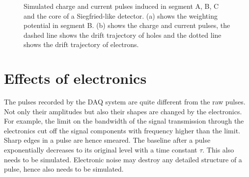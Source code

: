 \begin{figure}[htbp]
\centering
{}%
%
\caption{Simulated charge and current pulses induced in segment A, B, C and the core of a Siegfried-like detector. (a) shows the weighting potential in segment B. (b) shows the charge and current pulses, the dashed line shows the drift trajectory of holes and the dotted line shows the drift trajectory of electrons.}
\label{fig:pss:ps}
\end{figure}


\section{Effects of electronics}
\label{sec:pss:dbn}
The pulses recorded by the DAQ system are quite different from the raw pulses. Not only their amplitudes but also their shapes are changed by the electronics. For example, the limit on the bandwidth of the signal transmission through the electronics cut off the signal components with frequency higher than the limit. Sharp edges in a pulse are hence smeared. The baseline after a pulse exponentially decreases to its original level with a time constant $\tau$. This also needs to be simulated. Electronic noise may destroy any detailed structure of a pulse, hence also needs to be simulated.

